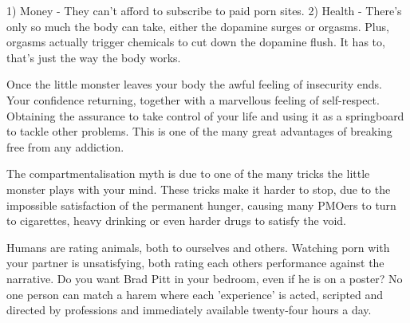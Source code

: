   1) Money - They can't afford to subscribe to paid porn sites.
  2) Health - There's only so much the body can take, either the dopamine surges or orgasms. Plus, orgasms actually trigger chemicals to cut down the dopamine flush. It has to, that's just the way the body works.

Once the little monster leaves your body the awful feeling of insecurity ends. Your confidence returning, together with a marvellous feeling of self-respect. Obtaining the assurance to take control of your life and using it as a springboard to tackle other problems. This is one of the many great advantages of breaking free from any addiction.

The compartmentalisation myth is due to one of the many tricks the little monster plays with your mind. These tricks make it harder to stop, due to the impossible satisfaction of the permanent hunger, causing many PMOers to turn to cigarettes, heavy drinking or even harder drugs to satisfy the void.

Humans are rating animals, both to ourselves and others. Watching porn with your partner is unsatisfying, both rating each others performance against the narrative. Do you want Brad Pitt in your bedroom, even if he is on a poster? No one person can match a harem where each 'experience' is acted, scripted and directed by professions and immediately available twenty-four hours a day.
